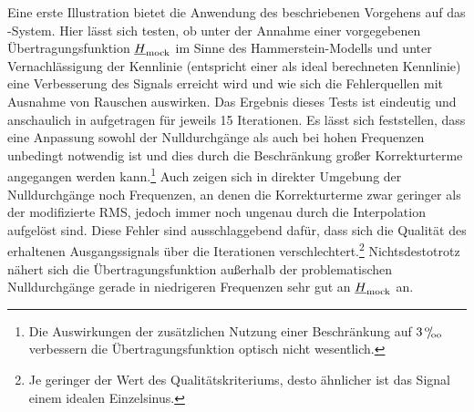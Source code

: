 \documentclass[../Report.tex]{subfiles}
\begin{document}
Eine erste Illustration bietet die Anwendung des beschriebenen Vorgehens auf das \mock-System. Hier lässt sich testen, ob unter der Annahme einer vorgegebenen Übertragungsfunktion  $\underline{H}_{ \mathrm{mock}}$ im Sinne des Hammerstein-Modells und unter Vernachlässigung der Kennlinie (entspricht einer als ideal berechneten Kennlinie) eine Verbesserung des Signals erreicht wird und wie sich die Fehlerquellen mit Ausnahme von Rauschen auswirken. 
Das Ergebnis dieses Tests ist eindeutig und anschaulich in  aufgetragen für jeweils 15 Iterationen. Es lässt sich feststellen, dass eine Anpassung sowohl der Nulldurchgänge als auch bei hohen Frequenzen unbedingt notwendig ist und dies durch die Beschränkung großer Korrekturterme angegangen werden kann.\footnote{Die Auswirkungen der zusätzlichen Nutzung einer Beschränkung auf $3 \, {}^\text{o}\mkern-5mu/\mkern-3mu_\text{oo}$ verbessern die Übertragungsfunktion optisch nicht wesentlich.}
Auch zeigen sich in direkter Umgebung der Nulldurchgänge noch Frequenzen, an denen die Korrekturterme zwar geringer als der modifizierte RMS, jedoch immer noch ungenau durch die Interpolation aufgelöst sind.
Diese Fehler sind ausschlaggebend dafür, dass sich die Qualität des erhaltenen Ausgangssignals über die Iterationen verschlechtert.\footnote{Je geringer der Wert des Qualitätskriteriums, desto ähnlicher ist das Signal einem idealen Einzelsinus.} Nichtsdestotrotz nähert sich die Übertragungsfunktion außerhalb der problematischen Nulldurchgänge gerade in niedrigeren Frequenzen sehr gut an $\underline{H}_{\mathrm{mock}}$ an. 
 
 
 \Hinit
{} \Hmock
{} \rmsHprom
{} \rmsHften
{} \simpleHften
\end{document}
